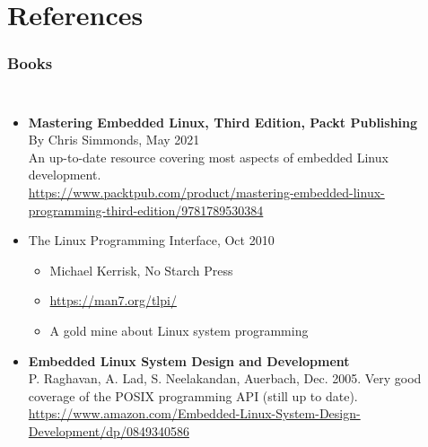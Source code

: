 \section{References}

\begin{frame}
  \frametitle{Books}
  \begin{columns}
    \small
    \begin{itemize}
    \item {\bf Mastering Embedded Linux, Third Edition, Packt Publishing}\\
      By Chris Simmonds, May 2021\\
      An up-to-date resource covering most aspects of embedded Linux
      development.\\
      {\scriptsize \url{https://www.packtpub.com/product/mastering-embedded-linux-programming-third-edition/9781789530384}}
    \item The Linux Programming Interface, Oct 2010
      \begin{itemize}
      \item Michael Kerrisk, No Starch Press
      \item \url{https://man7.org/tlpi/}
      \item A gold mine about Linux system programming
      \end{itemize}
    \item {\bf Embedded Linux System Design and Development}\\
      P. Raghavan, A. Lad, S. Neelakandan, Auerbach, Dec. 2005.
      Very good coverage of the POSIX programming API (still up
      to date).\\
      {\scriptsize \url{https://www.amazon.com/Embedded-Linux-System-Design-Development/dp/0849340586}}
    \end{itemize}
    \normalsize

\end{columns}
\end{frame}
